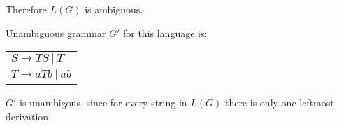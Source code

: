 \documentclass{article}
\newcommand{\enterProblemHeader}[1]{
    \nobreak\extramarks{}{Problem \arabic{#1} continued on next page\ldots}\nobreak{}
    \nobreak\extramarks{Problem \arabic{#1} (continued)}{Problem \arabic{#1} continued on next page\ldots}\nobreak{}
}
\newcommand{\exitProblemHeader}[1]{
    \nobreak\extramarks{Problem \arabic{#1} (continued)}{Problem \arabic{#1} continued on next page\ldots}\nobreak{}
    \stepcounter{#1}
    \nobreak\extramarks{Problem \arabic{#1}}{}\nobreak{}
}
\newcounter{partCounter}
\newcounter{homeworkProblemCounter}
\newenvironment{homeworkProblem}[1][-1]{
    \ifnum#1>0
        \setcounter{homeworkProblemCounter}{#1}
    \fi
    \section{Problem \arabic{homeworkProblemCounter}}
    \setcounter{partCounter}{1}
    \enterProblemHeader{homeworkProblemCounter}
}{
    \exitProblemHeader{homeworkProblemCounter}
}
\begin{document}
Therefore $L(G)$ is ambiguous.

Unambiguous grammar $G'$ for this language is:
\begin{table}[h!]
\centering
\begin{tabular}{l}
$S \rightarrow TS \:| \:T$ \\
$T \rightarrow aTb \:| \:ab$
\end{tabular}
\end{table}

$G'$ is unambigous, since for every string in $L(G)$ there is only one leftmost derivation.

\end{document}
